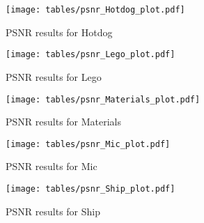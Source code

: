 \begin{figure}[h!]
\centering
\texttt{[image: tables/psnr\_Hotdog\_plot.pdf]}
\caption{PSNR results for Hotdog}
\label{fig:ap_psnr_Hotdog_plot}
\end{figure}

\begin{figure}[h!]
\centering
\texttt{[image: tables/psnr\_Lego\_plot.pdf]}
\caption{PSNR results for Lego}
\label{fig:ap_psnr_Lego_plot}
\end{figure}

\begin{figure}[h!]
\centering
\texttt{[image: tables/psnr\_Materials\_plot.pdf]}
\caption{PSNR results for Materials}
\label{fig:ap_psnr_Materials_plot}
\end{figure}

\begin{figure}[h!]
\centering
\texttt{[image: tables/psnr\_Mic\_plot.pdf]}
\caption{PSNR results for Mic}
\label{fig:ap_psnr_Mic_plot}
\end{figure}

\begin{figure}[h!]
\centering
\texttt{[image: tables/psnr\_Ship\_plot.pdf]}
\caption{PSNR results for Ship}
\label{fig:ap_psnr_Ship_plot}
\end{figure}
